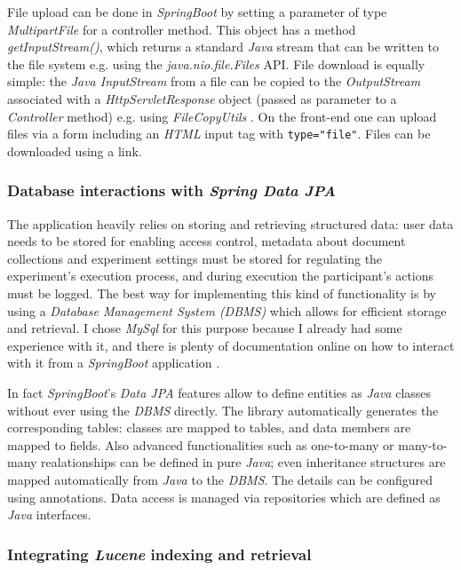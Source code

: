 \documentclass[a4paper]{usiinfbachelorproject}
\begin{document}
File upload can be done in \emph{SpringBoot} by setting a parameter of type \emph{MultipartFile} for a controller method. This object has a method
\emph{getInputStream()}, which returns a standard \emph{Java} stream that can be written to the file system e.g. using
the \emph{java.nio.file.Files} API. File download is equally simple: the \emph{Java InputStream} from a file can be copied to
the \emph{OutputStream} associated with a \emph{HttpServletResponse} object (passed as parameter to a \emph{Controller} method)
e.g. using \emph{FileCopyUtils} \cite{springFileUpload}. On the front-end one can upload files via a form including an
\emph{HTML} input tag with \texttt{type="file"}. Files can be downloaded using a link.

\subsubsection{\textbf{Database interactions with \emph{Spring Data JPA}}} \label{sec:archOverallDb}

The application heavily relies on storing and retrieving structured data: user data
needs to be stored for enabling access control, metadata about document collections and experiment settings
must be stored for regulating the experiment's execution process, and during execution the participant's
actions must be logged. The best way for implementing this kind of functionality is by using a
\emph{Database Management System (DBMS)} which allows for efficient storage and retrieval.
I chose \emph{MySql} for this purpose because I already had some experience with it, and there is plenty of documentation online on how to 
interact with it from a \emph{SpringBoot} application \cite{springJpaReference} \cite{springJpaTutorial}.

In fact \emph{SpringBoot}'s \emph{Data JPA} features allow to define entities as \emph{Java} classes without ever using the \emph{DBMS} directly.
The library automatically generates the corresponding tables: classes are mapped to tables, and data members are mapped to fields. Also advanced functionalities such as one-to-many or many-to-many realationships
can be defined in pure \emph{Java}; even inheritance structures are mapped automatically from \emph{Java} to the \emph{DBMS}. The
details can be configured using annotations.
Data access is managed via repositories which are defined as \emph{Java} interfaces.

\subsubsection{\textbf{Integrating \emph{Lucene} indexing and retrieval}}
\end{document}
